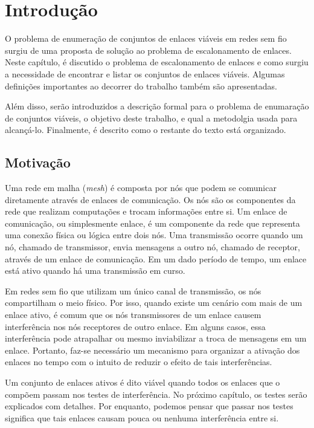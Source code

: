 \chapter{Introdução}
\label{cap:introducao}

O problema de enumeração de conjuntos de enlaces viáveis em redes sem fio surgiu de uma proposta de solução ao problema de escalonamento de enlaces. Neste capítulo, é discutido o problema de escalonamento de enlaces e como surgiu a necessidade de encontrar e listar os conjuntos de enlaces viáveis. Algumas definições importantes ao decorrer do trabalho também são apresentadas. 

Além disso, serão introduzidos a descrição formal para o problema de enumaração de conjuntos viáveis, o objetivo deste trabalho, e qual a metodolgia usada para alcançá-lo. Finalmente, é descrito como o restante do texto está organizado.

\section{Motivação}

Uma rede em malha ({\it mesh}) é composta por nós que podem se comunicar diretamente através de enlaces de comunicação. Os nós são os componentes da rede que realizam computações e trocam informações entre si. Um enlace de comunicação, ou simplesmente enlace, é um componente da rede que representa uma conexão física ou lógica entre dois nós.  Uma transmissão ocorre quando um nó, chamado de transmissor, envia mensagens a outro nó, chamado de receptor, através de um enlace de comunicação. Em um dado período de tempo, um enlace está ativo quando há uma transmissão em curso.

Em redes sem fio que utilizam um único canal de transmissão, os nós compartilham o meio físico. Por isso, quando existe um cenário com mais de um enlace ativo, é comum que os nós transmissores de um enlace causem interferência nos nós receptores de outro enlace. Em alguns casos, essa interferência pode atrapalhar ou mesmo inviabilizar a troca de mensagens em um enlace. Portanto, faz-se necessário um mecanismo para organizar a ativação dos enlaces no tempo com o intuito de reduzir o efeito de tais interferências.

Um conjunto de enlaces ativos é dito viável quando todos os enlaces que o compõem passam nos testes de interferência. No próximo capítulo, os testes serão explicados com detalhes. Por enquanto, podemos pensar que passar nos testes significa que tais enlaces causam pouca ou nenhuma interferência entre si.


